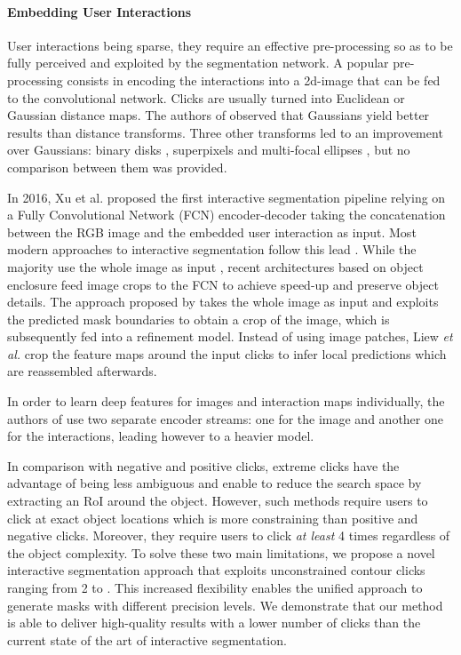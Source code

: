 \documentclass[letterpaper, 10 pt, conference]{ieeeconf}
\begin{document}
\paragraph{Embedding User Interactions} User interactions being sparse, they require an effective pre-processing so as to be fully perceived and exploited by the segmentation network. A popular pre-processing consists in encoding the interactions into a 2d-image that can be fed to the convolutional network. Clicks are usually turned into Euclidean \cite{xu16,liew17,hu18,li18,jang19} or Gaussian \cite{benard18,li18,maninis18,mahadevan18, forte20} distance maps.
The authors of \cite{benard18, mahadevan18, maninis18, benenson19} observed that Gaussians yield better results than distance transforms. Three other transforms led to an improvement over Gaussians: binary disks \cite{benenson19}, superpixels \cite{majumder19} and multi-focal ellipses \cite{shahin20}, but no comparison between them was provided.

In 2016, Xu et al. \cite{xu16} proposed the first interactive segmentation pipeline relying on a Fully Convolutional Network (FCN) encoder-decoder taking the concatenation between the RGB image and the embedded user interaction as input. Most modern approaches to interactive segmentation follow this lead \cite{mahadevan18, benard18, maninis18, benenson19, majumder19, liew17, liew19, shahin20}. While the majority use the whole image as input \cite{mahadevan18, benard18, majumder19, liew17, liew19, forte20, jang19}, recent architectures based on object enclosure \cite{maninis18, wang19, shahin20, benenson19, zhang20, sofiiuk20} feed image crops to the FCN to achieve speed-up and preserve object details. The approach proposed by \cite{sofiiuk20} takes the whole image as input and exploits the predicted mask boundaries to obtain a crop of the image, which is subsequently fed into a refinement model. Instead of using image patches, Liew \textit{et al.} \cite{liew17} crop the feature maps around the input clicks to infer local predictions which are reassembled afterwards.

In order to learn deep features for images and interaction maps individually, the authors of \cite{hu18, forte20} use two separate encoder streams: one for the image and another one for the interactions, leading however to a heavier model. 


In comparison with negative and positive clicks, extreme clicks have the advantage of being less ambiguous and enable to reduce the search space by extracting an RoI around the object. However, such methods require users to click at exact object locations which is more constraining than positive and negative clicks. Moreover, they require users to click \textit{at least} 4 times regardless of the object complexity. To solve these two main limitations, we propose a novel interactive segmentation approach that exploits unconstrained contour clicks ranging from 2 to . This increased flexibility enables the unified approach to generate masks with different precision levels. We demonstrate that our method is able to deliver high-quality results with a lower number of clicks than the current state of the art of interactive segmentation. 
\end{document}
